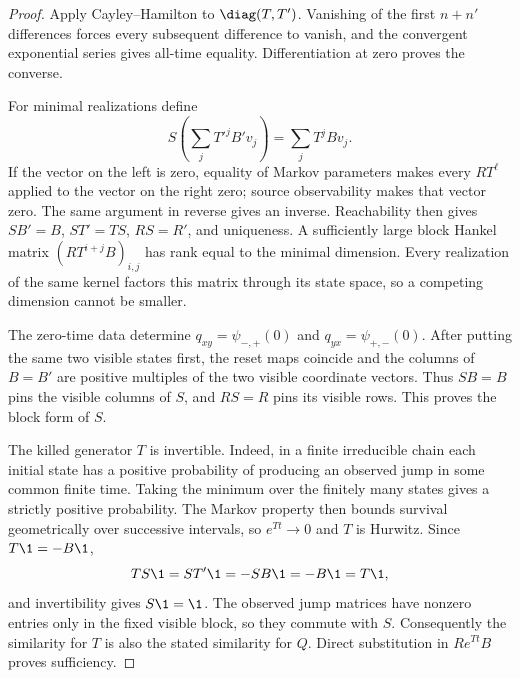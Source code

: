 \begin{proof}
Apply Cayley--Hamilton to $\diag(T,T')$. Vanishing of the first $n+n'$
differences forces every subsequent difference to vanish, and the
convergent exponential series gives all-time equality. Differentiation at
zero proves the converse.

For minimal realizations define
\begin{equation}
 S\left(\sum_jT'^jB'v_j\right)=\sum_jT^jBv_j.
\end{equation}
If the vector on the left is zero, equality of Markov parameters makes
every $RT^\ell$ applied to the vector on the right zero; source
observability makes that vector zero. The same argument in reverse gives
an inverse. Reachability then gives $SB'=B$, $ST'=TS$, $RS=R'$, and
uniqueness. A sufficiently large block Hankel matrix $(RT^{i+j}B)_{i,j}$
has rank equal to the minimal dimension. Every realization of the same
kernel factors this matrix through its state space, so a competing
dimension cannot be smaller.

The zero-time data determine $q_{xy}=\psi_{-,+}(0)$ and
$q_{yx}=\psi_{+,-}(0)$. After putting the same two visible states first,
the reset maps coincide and the columns of $B=B'$ are positive multiples
of the two visible coordinate vectors. Thus $SB=B$ pins the visible
columns of $S$, and $RS=R$ pins its visible rows. This proves the block
form of $S$.

The killed generator $T$ is invertible. Indeed, in a finite irreducible
chain each initial state has a positive probability of producing an
observed jump in some common finite time. Taking the minimum over the
finitely many states gives a strictly positive probability. The Markov
property then bounds survival geometrically over successive intervals,
so $e^{Tt}\to0$ and $T$ is Hurwitz. Since $T\1=-B\1$,
\begin{equation}
 TS\1=ST'\1=-SB\1=-B\1=T\1,
\end{equation}
and invertibility gives $S\1=\1$. The observed jump matrices have nonzero
entries only in the fixed visible block, so they commute with $S$.
Consequently the similarity for $T$ is also the stated similarity for
$Q$. Direct substitution in $Re^{Tt}B$ proves sufficiency.
\end{proof}

